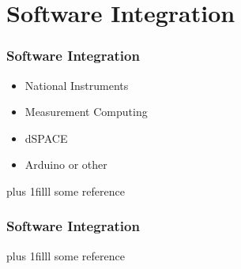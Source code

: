 \documentclass[fleqn]{beamer} %
\newcommand{\sectiontitleIV}{Software Integration}
\newcommand{\btVFill}{\vskip0pt plus 1filll}
\begin{document}
\section{\sectiontitleIV}	

\begin{frame}[label=sectionIV] \small
\frametitle{\sectiontitleIV}
\bigskip

\begin{itemize}
	\item National Instruments \vspace{6mm}\\
	
	\item Measurement Computing  \vspace{6mm}\\
	
	\item dSPACE  \vspace{6mm}\\
	
	\item Arduino or other 
	
\end{itemize}


\btVFill
\tiny{some reference}		

\end{frame}

\begin{frame}[label=sectionIV] \small
\frametitle{\sectiontitleIV}
\bigskip


\btVFill
\tiny{some reference}	
\end{frame}
\end{document}
